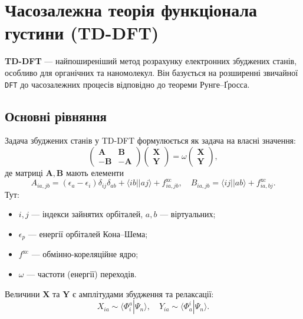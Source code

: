 \section{Часозалежна теорія функціонала густини (TD-DFT)}

\textbf{TD-DFT} --- найпоширеніший метод розрахунку електронних збуджених станів,
особливо для органічних та наномолекул. Він базується на розширенні
звичайної \texttt{DFT} до часозалежних процесів відповідно до теореми Рунге–Ґросса.

\subsection{Основні рівняння}

Задача збуджених станів у TD-DFT формулюється як задача на власні значення:
\[
    \begin{pmatrix}
        \mathbf{A}  & \mathbf{B}  \\
        -\mathbf{B} & -\mathbf{A}
    \end{pmatrix}
    \begin{pmatrix}
        \mathbf{X} \\
        \mathbf{Y}
    \end{pmatrix}
    =
    \omega
    \begin{pmatrix}
        \mathbf{X} \\
        \mathbf{Y}
    \end{pmatrix},
\]
де матриці \(\mathbf{A}, \mathbf{B}\) мають елементи
\[
    A_{ia,jb} = (\epsilon_a - \epsilon_i)\delta_{ij}\delta_{ab} +
    \langle ib || aj \rangle + f^{\text{xc}}_{ia,jb},
    \quad
    B_{ia,jb} = \langle ij || ab \rangle + f^{\text{xc}}_{ia,bj}.
\]
Тут:
\begin{itemize}
    \item \(i,j\) --- індекси зайнятих орбіталей, \(a,b\) --- віртуальних;
    \item \(\epsilon_p\) --- енергії орбіталей Кона–Шема;
    \item \(f^{\text{xc}}\) --- обмінно-кореляційне ядро;
    \item \(\omega\) --- частоти (енергії) переходів.
\end{itemize}

Величини \(\mathbf{X}\) та \(\mathbf{Y}\) є амплітудами збудження та релаксації:
\[
    X_{ia} \sim \langle \Phi_i^a | \Psi_n \rangle,
    \quad
    Y_{ia} \sim \langle \Phi_a^i | \Psi_n \rangle.
\]

